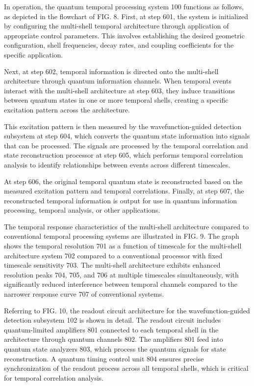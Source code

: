 \documentclass[12pt,letterpaper]{article}
\begin{document}
In operation, the quantum temporal processing system 100 functions as follows, as depicted in the flowchart of FIG. 8. First, at step 601, the system is initialized by configuring the multi-shell temporal architecture through application of appropriate control parameters. This involves establishing the desired geometric configuration, shell frequencies, decay rates, and coupling coefficients for the specific application.

Next, at step 602, temporal information is directed onto the multi-shell architecture through quantum information channels. When temporal events interact with the multi-shell architecture at step 603, they induce transitions between quantum states in one or more temporal shells, creating a specific excitation pattern across the architecture.

This excitation pattern is then measured by the wavefunction-guided detection subsystem at step 604, which converts the quantum state information into signals that can be processed. The signals are processed by the temporal correlation and state reconstruction processor at step 605, which performs temporal correlation analysis to identify relationships between events across different timescales.

At step 606, the original temporal quantum state is reconstructed based on the measured excitation pattern and temporal correlations. Finally, at step 607, the reconstructed temporal information is output for use in quantum information processing, temporal analysis, or other applications.

The temporal response characteristics of the multi-shell architecture compared to conventional temporal processing systems are illustrated in FIG. 9. The graph shows the temporal resolution 701 as a function of timescale for the multi-shell architecture system 702 compared to a conventional processor with fixed timescale sensitivity 703. The multi-shell architecture exhibits enhanced resolution peaks 704, 705, and 706 at multiple timescales simultaneously, with significantly reduced interference between temporal channels compared to the narrower response curve 707 of conventional systems.

Referring to FIG. 10, the readout circuit architecture for the wavefunction-guided detection subsystem 102 is shown in detail. The readout circuit includes quantum-limited amplifiers 801 connected to each temporal shell in the architecture through quantum channels 802. The amplifiers 801 feed into quantum state analyzers 803, which process the quantum signals for state reconstruction. A quantum timing control unit 804 ensures precise synchronization of the readout process across all temporal shells, which is critical for temporal correlation analysis.
\end{document}
